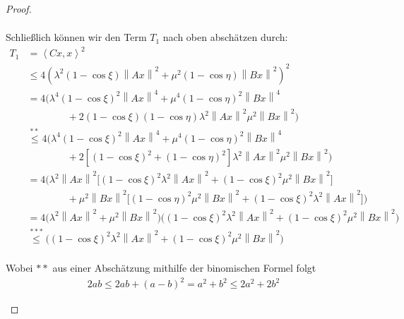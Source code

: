 \begin{proof}
\begin{enumerate}[label=\protect\circled{\arabic{*}}]
\begin{align}
        \end{align} 
        Schließlich können wir den Term $T_1$ nach oben abschätzen durch:
        \begin{align}
            T_1 &= \left<Cx,x \right>^2 \nonumber \\ 
            &\le 4 \left( \lambda^2 (1-\cos\xi) \left\| Ax \right\|^2 + \mu^2 (1-\cos\eta) \left\| Bx \right\|^2 \right)^2 \nonumber \\
            &= 4 \biggl( \lambda^4 (1-\cos\xi)^2 \left\| Ax \right\|^4 + \mu^4 (1-\cos\eta)^2 \left\| Bx \right\|^4 \nonumber \\[-10pt]
            &\phantom{===} + 2(1-\cos \xi)(1-\cos \eta) \lambda^2 \left\| Ax \right\|^2 \mu^2 \left\| Bx \right\|^2 \biggr) \nonumber \\
            &\overset{**}{\le} 4 \biggl( \lambda^4 (1-\cos\xi)^2 \left\| Ax \right\|^4 + \mu^4 (1-\cos\eta)^2 \left\| Bx \right\|^4 \nonumber \\[-10pt] 
            &\phantom{===} + 2\left[(1-\cos \xi)^2+(1-\cos \eta)^2\right] \lambda^2 \left\| Ax \right\|^2 \mu^2 \left\| Bx \right\|^2 \biggr) \nonumber \\
            &=4 \biggl( \lambda^2 \left\| Ax \right\|^2 \bigl[ (1-\cos \xi)^2\lambda^2 \left\| Ax \right\|^2 + (1-\cos \xi)^2 \mu^2 \left\| Bx \right\|^2 \bigr] \nonumber \\[-10pt]
            &\phantom{===} + \mu^2 \left\| Bx \right\|^2 \bigl[ (1-\cos \eta)^2\mu^2 \left\| Bx \right\|^2 + (1-\cos \xi)^2 \lambda^2 \left\| Ax \right\|^2 \bigr] \biggr) \nonumber \\
            &= 4 \bigl(\lambda^2 \left\| Ax \right\|^2 + \mu^2 \left\| Bx \right\|^2 \bigr) \bigl((1-\cos \xi)^2\lambda^2 \left\| Ax \right\|^2 + (1-\cos \xi)^2 \mu^2 \left\| Bx \right\|^2 \bigr)  \nonumber \\
            & \overset{***}{\le} \bigl((1-\cos \xi)^2\lambda^2 \left\| Ax \right\|^2 + (1-\cos \xi)^2 \mu^2 \left\| Bx \right\|^2 \bigr) \\ \label{eq:final_ineq_stab}
        \end{align}

        Wobei $**$ aus einer Abschätzung mithilfe der binomischen Formel folgt
        \begin{align}
            2ab \le 2ab + (a-b)^2 = a^2 + b^2 \le 2a^2 + 2 b^2            
        \end{align}
        

\end{enumerate}
\end{proof}
